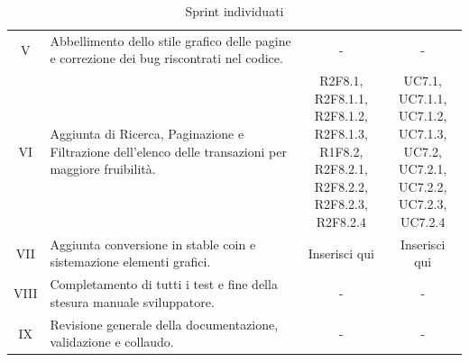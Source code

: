 \begin{table}[H]
\begin{tabular}{c|p{6cm}|c|c}
    V    & Abbellimento dello stile grafico delle pagine e correzione dei bug riscontrati nel codice.                                                                                            & -                                  & -             \\
    VI   & Aggiunta di Ricerca, Paginazione e Filtrazione dell'elenco delle transazioni per maggiore fruibilità.                                                                                 & \Shortunderstack{R2F8.1, R2F8.1.1,                 \\R2F8.1.2, R2F8.1.3,\\R1F8.2, R2F8.2.1,\\R2F8.2.2, R2F8.2.3,\\R2F8.2.4\\} & \Shortunderstack{UC7.1, UC7.1.1,\\UC7.1.2, UC7.1.3,\\UC7.2, UC7.2.1,\\UC7.2.2, UC7.2.3,\\UC7.2.4\\} \\
    VII  & Aggiunta conversione in stable coin e sistemazione elementi grafici.                                                                                                                  & Inserisci qui                      & Inserisci qui \\
    VIII & Completamento di tutti i test e fine della stesura manuale sviluppatore.                                                                                                              & -                                  & -             \\
    IX   & Revisione generale della documentazione, validazione e collaudo.                                                                                                                      & -                                  & -             \\
  \end{tabular}
  \caption{Sprint individuati}
\end{table}
\pagebreak